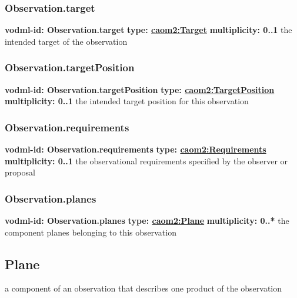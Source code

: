     \subsubsection{Observation.target}
      \textbf{vodml-id: Observation.target} \newline
      \textbf{type: \hyperref[sect:Target]{caom2:Target}} \newline
      \textbf{multiplicity: 0..1} \newline
      the intended target of the observation

    \subsubsection{Observation.targetPosition}
      \textbf{vodml-id: Observation.targetPosition} \newline
      \textbf{type: \hyperref[sect:TargetPosition]{caom2:TargetPosition}} \newline
      \textbf{multiplicity: 0..1} \newline
      the intended target position for this observation

    \subsubsection{Observation.requirements}
      \textbf{vodml-id: Observation.requirements} \newline
      \textbf{type: \hyperref[sect:Requirements]{caom2:Requirements}} \newline
      \textbf{multiplicity: 0..1} \newline
      the observational requirements specified by the observer or proposal

    \subsubsection{Observation.planes}
      \textbf{vodml-id: Observation.planes} \newline
      \textbf{type: \hyperref[sect:Plane]{caom2:Plane}} \newline
      \textbf{multiplicity: 0..*} \newline
      the component planes belonging to this observation

  \subsection{Plane}
  \label{sect:Plane}
    a component of an observation that describes one product of the observation

